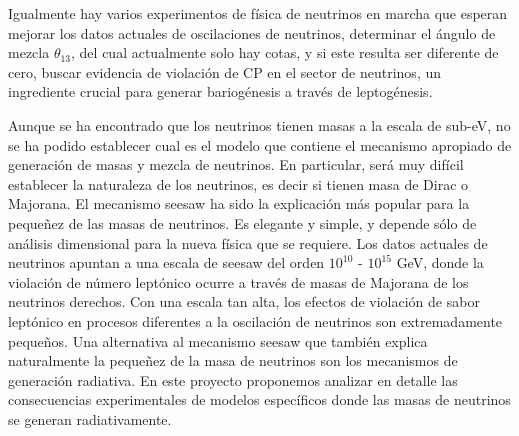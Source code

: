 \begin{ideas}
Igualmente hay varios experimentos de física de neutrinos en marcha que esperan mejorar los datos actuales de oscilaciones de neutrinos, determinar el ángulo de mezcla $\theta_{13}$, del cual actualmente solo hay cotas, y si este resulta ser diferente de cero, buscar evidencia de violación de CP en el sector de neutrinos, un ingrediente crucial para generar bariogénesis a través de leptogénesis.

 Aunque se ha encontrado que los neutrinos tienen masas a la escala de
sub-eV, no se ha podido establecer cual es el modelo que contiene
el mecanismo apropiado de generación de masas y mezcla de neutrinos.
En particular, será muy difícil establecer la naturaleza de los
neutrinos, es decir si tienen masa de Dirac o Majorana. El mecanismo seesaw %
ha sido la
explicación más popular para la pequeñez de las masas de neutrinos. Es
elegante y simple, y depende sólo de análisis dimensional para la
nueva física que se requiere. Los datos actuales de neutrinos
apuntan a una escala de seesaw del orden $10^{10}$ - $10^{15}$ GeV,
donde la violación de número leptónico ocurre a través de masas de
Majorana de los neutrinos derechos. Con una escala tan alta, los
efectos de violación de sabor leptónico en procesos diferentes a la
oscilación de neutrinos son extremadamente pequeños. Una alternativa al mecanismo seesaw que también explica naturalmente
la pequeñez de la masa de neutrinos son los mecanismos de generación
radiativa.
En este proyecto proponemos analizar en detalle las consecuencias
experimentales de modelos específicos donde las masas de
neutrinos se generan radiativamente.


\end{ideas}
